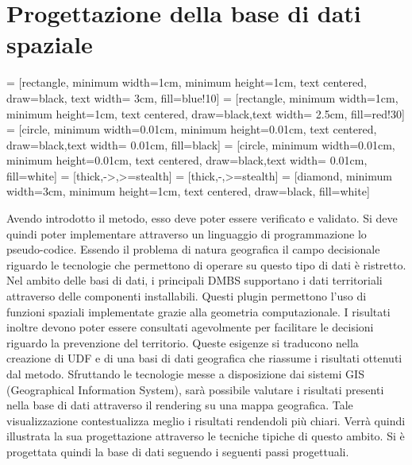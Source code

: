 
\chapter{Progettazione della base di dati spaziale}
\label{ProgettazioneBasiDati}
 = [rectangle, minimum width=1cm, minimum height=1cm, text centered, draw=black, text width= 3cm, fill=blue!10]
 = [rectangle, minimum width=1cm, minimum height=1cm, text centered, draw=black,text width= 2.5cm, fill=red!30]
 = [circle, minimum width=0.01cm, minimum height=0.01cm, text centered, draw=black,text width= 0.01cm, fill=black]
 = [circle, minimum width=0.01cm, minimum height=0.01cm, text centered, draw=black,text width= 0.01cm, fill=white]
 = [thick,->,>=stealth]
 = [thick,-,>=stealth]
 = [diamond, minimum width=3cm, minimum height=1cm, text centered, draw=black, fill=white]

 
Avendo introdotto il metodo, esso deve poter essere verificato e validato. 
Si deve quindi poter implementare attraverso un linguaggio di programmazione lo pseudo-codice. Essendo il problema di natura geografica il campo decisionale riguardo le tecnologie che permettono di operare su questo tipo di dati è ristretto.
Nel ambito delle basi di dati, i principali DMBS supportano i dati territoriali attraverso delle componenti installabili. Questi plugin permettono l'uso di funzioni
spaziali implementate grazie alla geometria computazionale. I risultati inoltre devono poter essere consultati agevolmente per facilitare le decisioni riguardo la prevenzione del territorio. Queste esigenze si traducono nella creazione di UDF e di una basi di dati geografica che riassume i risultati ottenuti dal metodo. Sfruttando le tecnologie messe a disposizione dai sistemi GIS (Geographical Information System), sarà possibile valutare i risultati presenti nella base di dati attraverso il rendering su una mappa geografica. Tale visualizzazione contestualizza meglio i risultati rendendoli più chiari. Verrà quindi illustrata la sua progettazione attraverso le tecniche tipiche di questo ambito.
Si è progettata quindi la base di dati seguendo i seguenti passi progettuali.


